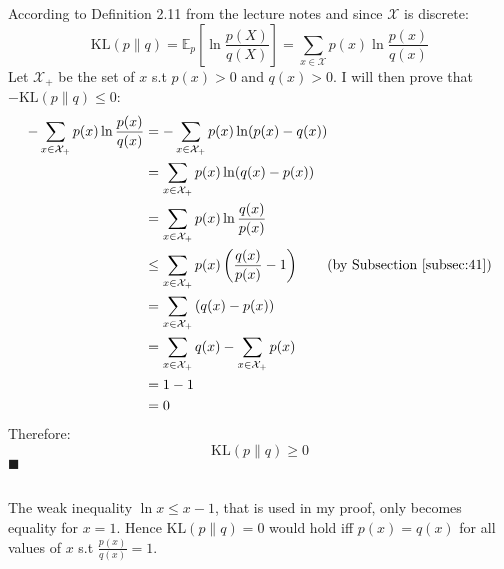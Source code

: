 \documentclass[a4paper]{article}
\newcommand*{\QEDA}{\hfill\ensuremath{\blacksquare}}%
\begin{document}
\subsection{}
\label{subsec:42}
According to Definition 2.11 from the lecture notes and since
$\mathcal{X}$ is discrete:
\[
\mathrm{KL}(p \| q)=\mathbb{E}_{p}\left[\ln \frac{p(X)}{q(X)}\right]
= \sum_{x \in \mathcal{X}} p(x) \ln \frac{p(x)}{q(x)}
\]
Let $\mathcal{X}_+$ be the set of $x$ s.t $p(x)>0$ and $q(x)>0$. I will then
prove that $-\mathrm{KL}(p \| q) \leq 0$:
\begin{align*}
  -\sum_{x \in \mathcal{X}_{+}} p(x) \ln \frac{p(x)}{q(x)}
  &=    -\sum_{x \in \mathcal{X}_+} p(x) \ln (p(x) - q(x)) \\
  &= \sum_{x \in \mathcal{X}_+} p(x) \ln (q(x) - p(x)) \\
  &= \sum_{x \in \mathcal{X}_+} p(x) \ln \frac{q(x)}{p(x)} \\
  &\leq \sum_{x \in \mathcal{X}_+} p(x)\left(\frac{q(x)}{p(x)}-1\right)
  \tag{by Subsection \ref{subsec:41}}\\
  &= \sum_{x \in \mathcal{X}_+} \left(q(x) - p(x)\right) \\
  &= \sum_{x \in \mathcal{X}_+} q(x) - \sum_{x \in \mathcal{X}_+} p(x)\\
  &= 1 - 1 \\
  &= 0
\end{align*}
Therefore:
\[
\mathrm{KL}(p \| q) \geq 0
\]
\QEDA

\subsection{}
\label{subsec:43}
The weak inequality $\ln x \leq x - 1$, that is used in my proof, only becomes
equality for $x=1$. Hence $\mathrm{KL}(p \| q)=0$ would hold
iff $p(x) = q(x)$ for all values of $x$ s.t $\frac{p(x)}{q(x)} = 1$.
\end{document}
